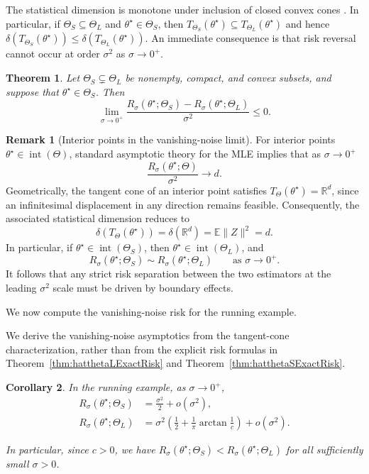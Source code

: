 \documentclass[11pt]{article}
\theoremstyle{plain}
\newtheorem{theorem}{Theorem}[section]
\newtheorem{corollary}[theorem]{Corollary}
\theoremstyle{definition}
\newtheorem*{remark}{Remark}
\providecommand{\mathbbm}{\mathbb} %
\newcommand{\R}{\mathbbm{R}}
\newcommand{\E}{\mathbb{E}}
\begin{document}
The statistical dimension is monotone under inclusion of closed convex cones \cite[Proposition~3.1]{amelunxen2014living}. In particular, if $\Theta_S\subseteq\Theta_L$ and $\theta^\star\in\Theta_S$, then $T_{\Theta_S}(\theta^\star) \subseteq T_{\Theta_L}(\theta^\star)$ and hence $\delta\!\left(T_{\Theta_S}(\theta^\star)\right) \le \delta\!\left(T_{\Theta_L}(\theta^\star)\right).$ An immediate consequence is that risk reversal cannot occur at order $\sigma^2$ as $\sigma \to 0^+$. 

\begin{theorem}\label{thm:NoRRinSmallNoise} 
Let $\Theta_S \subsetneq \Theta_L$ be nonempty, compact, and convex subsets, and suppose that $\theta^\star\in\Theta_S$. Then
\[
\lim_{\sigma\to0^+}
\frac{
R_\sigma(\theta^\star;\Theta_S)
-
R_\sigma(\theta^\star;\Theta_L)
}{\sigma^2}
\le 0.
\]
\end{theorem} 

\begin{remark}[Interior points in the vanishing-noise limit]
For interior points $\theta^\star \in \operatorname{int}(\Theta)$, standard asymptotic theory for the MLE implies that as $\sigma \to 0^{+}$
\[
\frac{R_\sigma(\theta^\star; \Theta)}{\sigma^2} \to d.
\]
Geometrically, the tangent cone of an interior point satisfies $ T_\Theta(\theta^\star)=\R^d$, since an infinitesimal displacement in any direction remains feasible. Consequently, the associated statistical dimension reduces to
\[
\delta(T_\Theta(\theta^\star))=\delta(\R^d)=\E\|Z\|^2=d.
\]
In particular, if $\theta^\star \in \operatorname{int}(\Theta_S)$, then
$\theta^\star \in \operatorname{int}(\Theta_L)$, and
\[
R_\sigma(\theta^\star; \Theta_S) \sim R_\sigma(\theta^\star; \Theta_L)
\qquad \text{as } \sigma \to 0^{+}.
\]
It follows that any strict risk separation between the two estimators at the leading $\sigma^2$ scale must be driven by boundary effects. 
\end{remark}


We now compute the vanishing-noise risk for the running example. 

We derive the vanishing-noise asymptotics from the tangent-cone characterization, rather than from the explicit risk formulas in Theorem~\ref{thm:hatthetaLExactRisk} and
Theorem~\ref{thm:hatthetaSExactRisk}.

\begin{corollary}\label{cor:VanishingNoiseThetaSLRisks}
In the running example, as $\sigma \to 0^{+}$,
\begin{align*}
R_\sigma(\theta^\star; \Theta_S)
&=
\frac{\sigma^2}{2}
+ o(\sigma^2), \\
R_\sigma(\theta^\star; \Theta_L)
&=
\sigma^2\left(\frac{1}{2} + \frac{1}{\pi}\arctan \frac{1}{c} \right)
+ o(\sigma^2).
\end{align*}

In particular, since $c>0$, we have $R_\sigma(\theta^\star; \Theta_S)
<
R_\sigma(\theta^\star; \Theta_L)$ for all sufficiently small $\sigma>0$.
\end{corollary}
\end{document}
